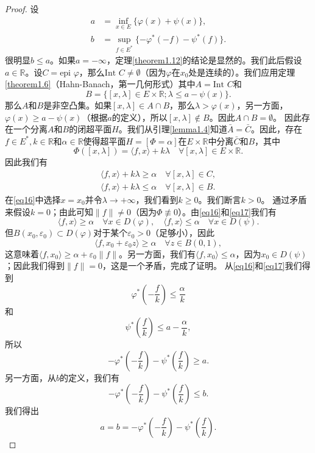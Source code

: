 \begin{proof}
设
\begin{align*}
a &= \inf_{x \in E} \{\varphi(x) + \psi(x)\}, \\
b &= \sup_{f \in E^*} \{-\varphi^*(-f) - \psi^*(f)\}.
\end{align*}
很明显$b \leq a$。如果$a = -\infty$，定理\ref{theorem1.12}的结论是显然的。我们此后假设$a \in \mathbb{R}$。设$C=\text{epi } \varphi$，那么$\text{Int } C \neq \emptyset$（因为$\varphi$在$x_0$处是连续的）。我们应用定理\ref{theorem1.6}（Hahn-Banach，第一几何形式）其中$A=\text{Int } C$和
\[ B = \{[x, \lambda] \in E \times \mathbb{R}; \lambda \leq a-\psi(x)\}. \]
那么$A$和$B$是非空凸集。如果$[x, \lambda] \in A \cap B$，那么$\lambda > \varphi(x)$，另一方面，$\varphi(x) \geq a-\psi(x)$（根据$a$的定义），所以$[x, \lambda] \notin B$。因此$A \cap B = \emptyset$。
因此存在一个分离$A$和$B$的闭超平面$H$。我们从引理\ref{lemma1.4}知道$\bar{A}=\bar{C}$。因此，存在$f \in E^*, k \in \mathbb{R}$和$\alpha \in \mathbb{R}$使得超平面$H = [\Phi = \alpha]$在$E \times \mathbb{R}$中分离$\bar{C}$和$B$，其中
\[ \Phi([x, \lambda]) = \langle f, x \rangle + k\lambda \quad \forall [x, \lambda] \in E \times \mathbb{R}. \]
因此我们有
\begin{gather}
\langle f, x \rangle + k\lambda \geq \alpha \quad \forall [x, \lambda] \in C, \label{eq16} \\
\langle f, x \rangle + k\lambda \leq \alpha \quad \forall [x, \lambda] \in B. \label{eq17}
\end{gather}
在\eqref{eq16}中选择$x=x_0$并令$\lambda \to +\infty$，我们看到$k \geq 0$。我们断言$k>0$。
通过矛盾来假设$k=0$；由此可知$\|f\| \neq 0$（因为$\Phi \not\equiv 0$）。由\eqref{eq16}和\eqref{eq17}我们有
\[ \langle f, x \rangle \geq \alpha \quad \forall x \in D(\varphi), \quad \langle f, x \rangle \leq \alpha \quad \forall x \in D(\psi). \]
但$B(x_0, \varepsilon_0) \subset D(\varphi)$对于某个$\varepsilon_0 > 0$（足够小），因此
\[ \langle f, x_0 + \varepsilon_0 z \rangle \geq \alpha \quad \forall z \in B(0,1), \]
这意味着$\langle f, x_0 \rangle \geq \alpha + \varepsilon_0\|f\|$。另一方面，我们有$\langle f, x_0 \rangle \leq \alpha$，因为$x_0 \in D(\psi)$；因此我们得到$\|f\|=0$，这是一个矛盾，完成了证明。
从\eqref{eq16}和\eqref{eq17}我们得到
\[ \varphi^*\left(-\frac{f}{k}\right) \leq \frac{\alpha}{k} \]
和
\[ \psi^*\left(\frac{f}{k}\right) \leq a - \frac{\alpha}{k}, \]
所以
\[ -\varphi^*\left(-\frac{f}{k}\right) - \psi^*\left(\frac{f}{k}\right) \geq a. \]
另一方面，从$b$的定义，我们有
\[ -\varphi^*\left(-\frac{f}{k}\right) - \psi^*\left(\frac{f}{k}\right) \leq b. \]
我们得出
\[ a=b = -\varphi^*\left(-\frac{f}{k}\right) - \psi^*\left(\frac{f}{k}\right). \]
\end{proof}

